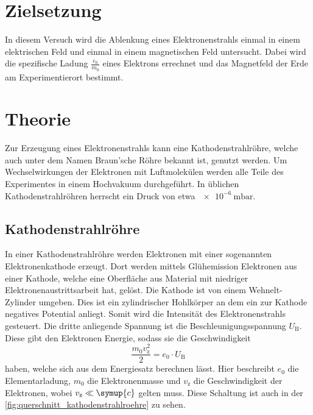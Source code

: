\section{Zielsetzung}
\label{sec:Zielsetzung}

    In diesem Versuch wird die Ablenkung eines Elektronenstrahls einmal in einem elektrischen Feld und einmal in einem magnetischen Feld untersucht. Dabei wird 
    die spezifische Ladung $\frac{e_0}{m_0}$ eines Elektrons errechnet und das Magnetfeld der Erde am Experimentierort bestimmt. 

\section{Theorie}
\label{sec:Theorie}

Zur Erzeugung eines Elektronenstrahls kann eine Kathodenstrahlröhre, welche auch unter dem Namen Braun'sche Röhre bekannt ist, genutzt werden. Um Wechselwirkungen 
der Elektronen mit Luftmolekülen werden alle Teile des Experimentes in einem Hochvakuum durchgeführt. In üblichen Kathodenstrahlröhren herrscht ein Druck von 
etwa $\SI{e-6}{\milli\bar}$. 

\subsection{Kathodenstrahlröhre}

    In einer Kathodenstrahlröhre werden Elektronen mit einer sogenannten Elektronenkathode erzeugt. Dort werden mittels Glühemission Elektronen aus einer
    Kathode, welche eine Oberfläche aus Material mit niedriger Elektronenaustrittsarbeit hat, gelöst. Die Kathode ist von einem Wehnelt-Zylinder umgeben.
    Dies ist ein zylindrischer Hohlkörper an dem ein zur Kathode negatives Potential anliegt. Somit wird die Intensität des Elektronenstrahls gesteuert. 
    Die dritte anliegende Spannung ist die Beschleunigungsspannung $U_{\text{B}}$. Diese gibt den Elektronen Energie, sodass sie die Geschwindigkeit
    \begin{equation} \label{eqn:v_z}
        \frac{m_0 v_{\text{z}}^2}{2} = e_0 \cdot U_{\text{B}}
    \end{equation}
    haben, welche sich aus dem Energiesatz berechnen lässt. Hier beschreibt $e_0$ die Elementarladung, $m_0$ die Elektronenmasse und $v_{\text{z}}$ die 
    Geschwindigkeit der Elektronen, wobei $v_{\text{z}} \ll \symup{c} $ gelten muss. Diese Schaltung ist auch in der \autoref{fig:querschnitt_kathodenstrahlroehre}
    zu sehen.\\

